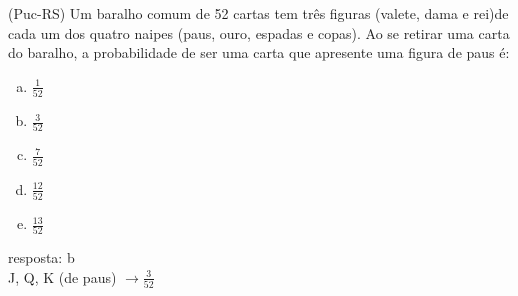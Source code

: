 \begin{ex}
 (Puc-RS) Um baralho comum de 52 cartas tem três figuras (valete, dama e rei)de cada um dos quatro naipes (paus, ouro, espadas e copas). Ao se retirar uma carta do baralho, a probabilidade de ser uma carta que apresente uma figura de paus é:
    \begin{enumerate}[(a)]
    \item $\frac{1}{52}$
    \item $\frac{3}{52}$
    \item $\frac{7}{52}$
    \item $\frac{12}{52}$
    \item $\frac{13}{52}$ 
      \end{enumerate}
    \begin{sol}
      resposta: b \\
      J, Q, K (de paus) $\rightarrow \frac{3}{52}$
   
  \end{sol}
\end{ex}